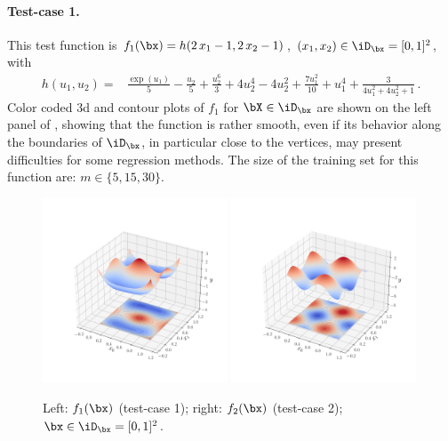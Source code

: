 \paragraph{Test-case 1.}

This test function is $f_1(\bx) = h(2\,x_1 - 1, 2\,x_2 - 1)$, $(x_1,x_2) \in \iD_\bx=[0,1]^2$, with
\begin{align*}
  h(u_1, u_2) =& \frac{\exp(u_1)}{5} - \frac{u_2}{5} + \frac{u_2^6}{3} + 4 u_2^4 - 4 u_2^2 + \frac{7u_1^2}{10} + u_1^4 + \frac{3}{4 u_1^2 + 4 u_2^2 + 1}\,. %
\end{align*}
Color coded 3d and contour plots of $f_1$ for $\bX\in\iD_\bx$ are shown on the left panel of , showing that 
the function is rather smooth, even if its behavior along the boundaries of $\iD_\bx$, in particular close to the vertices, may present difficulties for some regression methods. 
The size of the training set for this function are: $m\in\{5, 15, 30\}$.


\begin{figure}
  \centering
  \includegraphics[width=0.49\textwidth]{./part2/figures/SIS/irregular_function3D.pdf}
    \includegraphics[width=0.49\textwidth]{./part2/figures/SIS/cosin2_function3D.pdf}
  \caption{Left: $f_1(\bx)$ (test-case 1); right: $f_2(\bx)$ (test-case 2); $\bx\in\iD_\bx=[0,1]^2$.} 
  \label{fig:f1&f2}
\end{figure}



